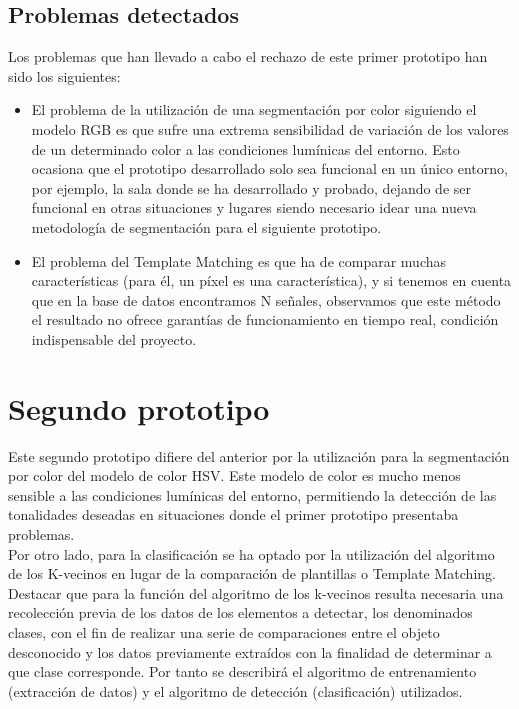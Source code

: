 \subsection{Problemas detectados}

Los problemas que han llevado a cabo el rechazo de este primer prototipo han sido los siguientes:

\begin{itemize}

\item El problema de la utilización de una segmentación por color siguiendo el modelo RGB es que sufre una extrema sensibilidad de variación de los valores de un determinado color a las condiciones lumínicas del entorno. Esto ocasiona que el prototipo desarrollado solo sea funcional en un único entorno, por ejemplo, la sala donde se ha desarrollado y probado, dejando de ser funcional en otras situaciones y lugares siendo necesario idear una nueva metodología de segmentación para el siguiente prototipo.

\item El problema del Template Matching es que ha de comparar muchas características (para él, un píxel es una característica), y si tenemos en cuenta que en la base de datos encontramos N señales, observamos que este método el resultado no ofrece garantías de funcionamiento en tiempo real, condición indispensable del proyecto.

\end{itemize}

\section{Segundo prototipo}

Este segundo prototipo difiere del anterior por la utilización para la segmentación por color del modelo de color HSV. Este modelo de color es mucho menos sensible a las condiciones lumínicas del entorno, permitiendo la detección de las tonalidades deseadas en situaciones donde el primer prototipo presentaba problemas.\\

Por otro lado, para la clasificación se ha optado por la utilización del algoritmo de los K-vecinos en lugar de la comparación de plantillas o Template Matching.\\

Destacar que para la función del algoritmo de los k-vecinos resulta necesaria una recolección previa de los datos de los elementos a detectar, los denominados clases, con el fin de realizar una serie de comparaciones entre el objeto desconocido y los datos previamente extraídos con la finalidad de determinar a que clase corresponde. Por tanto se describirá el algoritmo de entrenamiento (extracción de datos) y el algoritmo de detección (clasificación) utilizados.

